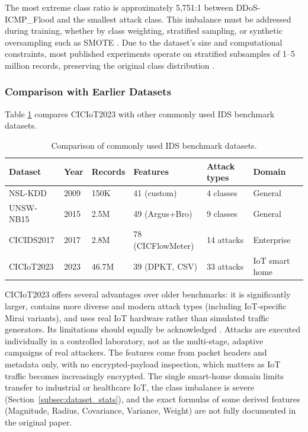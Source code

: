 \par The most extreme class ratio is approximately 5,751:1 between DDoS-ICMP\_Flood and the smallest attack class. This imbalance must be addressed during training, whether by class weighting, stratified sampling, or synthetic oversampling such as SMOTE \cite{Chawla2002}. Due to the dataset's size and computational constraints, most published experiments operate on stratified subsamples of 1--5 million records, preserving the original class distribution \cite{CICIoT2023}.

\subsubsection{Comparison with Earlier Datasets}
\label{subsec:dataset_comparison}

\par Table \ref{tab:dataset_comparison} compares CICIoT2023 with other commonly used IDS benchmark datasets.

\begin{table}[htbp]
\begin{center}
\begin{tabular}{|p{82pt}|p{28pt}|p{42pt}|p{55pt}|p{38pt}|p{55pt}|}
\hline
\textbf{Dataset} & \textbf{Year} & \textbf{Records} & \textbf{Features} & \textbf{Attack types} & \textbf{Domain} \\
\hline
\hline NSL-KDD \cite{Tavallaee2009} & 2009 & 150K & 41 (custom) & 4 classes & General \\
\hline UNSW-NB15 \cite{Moustafa2015} & 2015 & 2.5M & 49 (Argus+Bro) & 9 classes & General \\
\hline CICIDS2017 \cite{Sharafaldin2018} & 2017 & 2.8M & 78 (CICFlowMeter) & 14 attacks & Enterprise \\
\hline CICIoT2023 \cite{CICIoT2023} & 2023 & 46.7M & 39 (DPKT, CSV) & 33 attacks & IoT smart home \\
\hline
\end{tabular}
\end{center}
\caption{Comparison of commonly used IDS benchmark datasets.}
\label{tab:dataset_comparison}
\end{table}

\par CICIoT2023 offers several advantages over older benchmarks: it is significantly larger, contains more diverse and modern attack types (including IoT-specific Mirai variants), and uses real IoT hardware rather than simulated traffic generators. Its limitations should equally be acknowledged \cite{CICIoT2023}. Attacks are executed individually in a controlled laboratory, not as the multi-stage, adaptive campaigns of real attackers. The features come from packet headers and metadata only, with no encrypted-payload inspection, which matters as IoT traffic becomes increasingly encrypted. The single smart-home domain limits transfer to industrial or healthcare IoT, the class imbalance is severe (Section~\ref{subsec:dataset_stats}), and the exact formulas of some derived features (Magnitude, Radius, Covariance, Variance, Weight) are not fully documented in the original paper.

